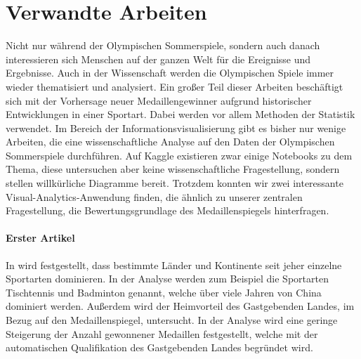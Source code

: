 \section{Verwandte Arbeiten}

Nicht nur während der Olympischen Sommerspiele, sondern auch danach interessieren sich Menschen auf der ganzen Welt für die Ereignisse und Ergebnisse. Auch in der Wissenschaft werden die Olympischen Spiele immer wieder thematisiert und analysiert. Ein großer Teil dieser Arbeiten beschäftigt sich mit der Vorhersage neuer Medaillengewinner aufgrund historischer Entwicklungen in einer Sportart. Dabei werden vor allem Methoden der Statistik verwendet. Im Bereich der Informationsvisualisierung gibt es bisher nur wenige  Arbeiten, die eine wissenschaftliche Analyse auf den Daten der Olympischen Sommerspiele durchführen. Auf Kaggle existieren zwar einige Notebooks zu dem Thema, diese untersuchen aber keine wissenschaftliche Fragestellung, sondern stellen willkürliche Diagramme bereit. Trotzdem konnten wir zwei interessante Visual-Analytics-Anwendung finden, die ähnlich zu unserer zentralen Fragestellung, die Bewertungsgrundlage des Medaillenspiegels hinterfragen.

\paragraph{Erster Artikel}
In \cite{relWork1} wird festgestellt, dass bestimmte Länder und Kontinente seit jeher einzelne Sportarten dominieren. In der Analyse werden zum Beispiel die Sportarten Tischtennis und Badminton genannt, welche über viele Jahren von China dominiert werden. Außerdem wird der Heimvorteil des Gastgebenden Landes, im Bezug auf den Medaillenspiegel, untersucht. In der Analyse wird eine geringe Steigerung der Anzahl gewonnener Medaillen festgestellt, welche mit der automatischen Qualifikation des Gastgebenden Landes begründet wird.

